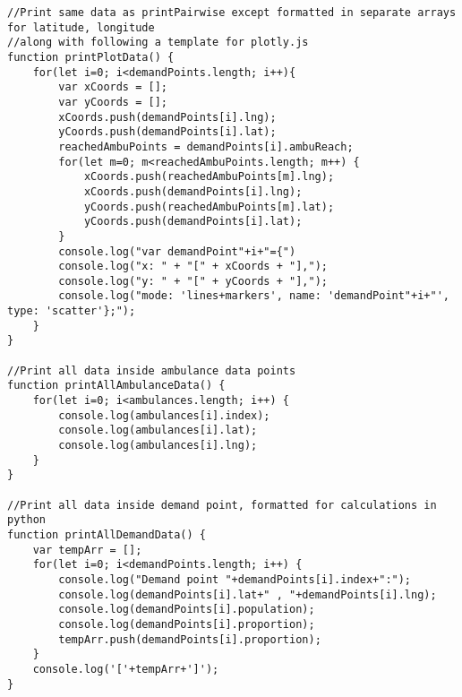 \documentclass{article}
\newenvironment{code}{\captionsetup{type=listing}}{}
\begin{document}
\begin{code}
\begin{verbatim}
//Print same data as printPairwise except formatted in separate arrays for latitude, longitude
//along with following a template for plotly.js
function printPlotData() {
    for(let i=0; i<demandPoints.length; i++){
        var xCoords = [];
        var yCoords = [];
        xCoords.push(demandPoints[i].lng);
        yCoords.push(demandPoints[i].lat);
        reachedAmbuPoints = demandPoints[i].ambuReach;
        for(let m=0; m<reachedAmbuPoints.length; m++) {
            xCoords.push(reachedAmbuPoints[m].lng);
            xCoords.push(demandPoints[i].lng);
            yCoords.push(reachedAmbuPoints[m].lat);
            yCoords.push(demandPoints[i].lat);
        }
        console.log("var demandPoint"+i+"={")
        console.log("x: " + "[" + xCoords + "],");
        console.log("y: " + "[" + yCoords + "],");
        console.log("mode: 'lines+markers', name: 'demandPoint"+i+"', type: 'scatter'};");
    }
}

//Print all data inside ambulance data points
function printAllAmbulanceData() {
    for(let i=0; i<ambulances.length; i++) {
        console.log(ambulances[i].index);
        console.log(ambulances[i].lat);
        console.log(ambulances[i].lng);
    }
}

//Print all data inside demand point, formatted for calculations in python
function printAllDemandData() {
    var tempArr = [];
    for(let i=0; i<demandPoints.length; i++) {
        console.log("Demand point "+demandPoints[i].index+":");
        console.log(demandPoints[i].lat+" , "+demandPoints[i].lng);
        console.log(demandPoints[i].population);
        console.log(demandPoints[i].proportion);
        tempArr.push(demandPoints[i].proportion);
    }
    console.log('['+tempArr+']');
}
\end{verbatim}
\end{code}


\end{document}

